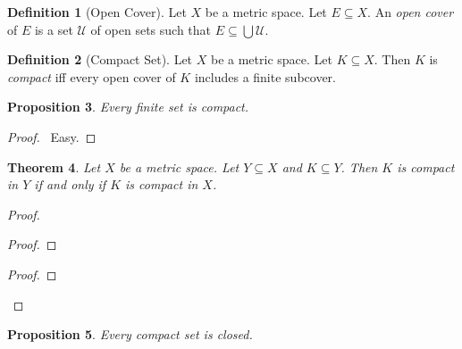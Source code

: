\documentclass{book}
\let\qed\relax
\newtheorem{prop}{Proposition}[chapter]
\newtheorem{thm}[prop]{Theorem}
\theoremstyle{definition}
\newtheorem{df}[prop]{Definition}
\begin{document}
\begin{df}[Open Cover]
Let $X$ be a metric space. Let $E \subseteq X$. An 
\emph{open cover} of $E$ is a set $\mathcal{U}$ of open sets such that $E \subseteq \bigcup \mathcal{U}$.
\end{df}

\begin{df}[Compact Set]
Let $X$ be a metric space. Let $K \subseteq X$. Then $K$ is \emph{compact} iff every open cover of $K$ includes a finite subcover.
\end{df}

\begin{prop}
Every finite set is compact.
\end{prop}

\begin{proof}
\pf\ Easy. \qed
\end{proof}

\begin{thm}
Let $X$ be a metric space. Let $Y \subseteq X$ and $K \subseteq Y$. Then $K$ is compact in $Y$ if and only if $K$ is compact in $X$.
\end{thm}

\begin{proof}
\pf
{}
\begin{proof}
\end{proof}
\begin{proof}
\end{proof}
\qed
\end{proof}

\begin{prop}
\label{prop:compact_closed}
Every compact set is closed.
\end{prop}
\end{document}
